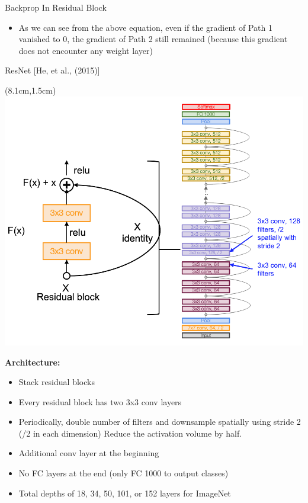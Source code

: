 \documentclass[serif, aspectratio=169]{beamer}
\begin{document}
\begin{frame}{Backprop In Residual Block}
	\vspace{2cm}
	\begin{itemize}
		\item As we can see from the above equation, even if the gradient \newline of Path 1 vanished to 0, the gradient of Path 2 still remained \newline (because this gradient does not encounter any weight layer)
	\end{itemize}
\end{frame}

\begin{frame}{ResNet [He, et al., (2015)]}
	\begin{textblock*}{5cm}(8.1cm,1.5cm) %
		\includegraphics[keepaspectratio, scale=0.24]{pic/res_arch}
	\end{textblock*}
	\textbf{Architecture:}
	\begin{itemize}
		\item Stack residual blocks
		\item Every residual block has two 3x3 conv layers
		\item Periodically, double number of filters \newline and downsample spatially using \newline stride 2 (/2 in each dimension) Reduce \newline the activation volume by half.
		\item Additional conv layer at the beginning
		\item No FC layers at the end (only FC 1000 \newline to output classes)
		\item Total depths of 18, 34, 50, 101, or 152 layers for ImageNet
	\end{itemize}
\end{frame}
\end{document}

